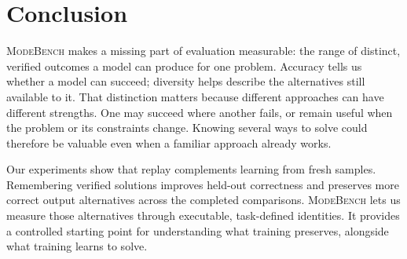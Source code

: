\documentclass{article}
\newcommand{\1}{\mathbf 1}
\newcommand{\mb}{\textsc{ModeBench}}
\theoremstyle{remark}
\theoremstyle{definition}
\theoremstyle{plain}
\begin{document}
\long{}

\section{Conclusion}
\label{sec:conclusion}
\label{sec:discussion}
\label{sec:limitations}

\mb{} makes a missing part of evaluation measurable: the range of distinct,
verified outcomes a model can produce for one problem. Accuracy tells us whether
a model can succeed; diversity helps describe the alternatives still available
to it. That distinction matters because different approaches can have different
strengths. One may succeed where another fails, or remain useful when the
problem or its constraints change. Knowing several ways to solve could therefore
be valuable even when a familiar approach already works.

Our experiments show that replay complements learning from fresh samples.
Remembering verified solutions improves held-out correctness and preserves
more correct output alternatives across the completed comparisons. \mb{}
lets us measure those alternatives through executable, task-defined identities.
It provides a controlled starting point for understanding what training
preserves, alongside what training learns to solve.
\end{document}

